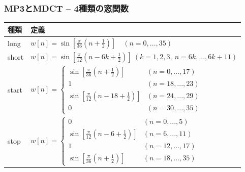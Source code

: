 \documentclass[14pt,xcolor=dvipsnames,table,dvipdfmx]{beamer}
\begin{document}
\begin{frame}[c]
    \frametitle{MP3とMDCT -- 4種類の窓関数}
    \footnotesize
    \begin{table}[H]
        \begin{tabular}{|l|l|}
            \toprule
            種類 & 定義 \\ 
            \midrule
             long & $\displaystyle w[n] = \sin\left[ \frac{\pi}{36} \left( n + \frac{1}{2} \right) \right] \quad (n = 0, ..., 35)$ \\[3ex]
            short & $\displaystyle w[n] = \sin\left[ \frac{\pi}{12} \left( n - 6k + \frac{1}{2} \right) \right] \ (k = 1,2,3,\ n = 6k, ..., 6k+11)$ \\[3ex]
            start & $\displaystyle w[n] =
            \left\{ \begin{array}{ll}
                \sin\left[ \frac{\pi}{36} \left( n + \frac{1}{2} \right) \right] & (n = 0, ..., 17) \\
                1 & (n = 18, ..., 23) \\
                \sin\left[ \frac{\pi}{12} \left( n - 18 + \frac{1}{2} \right) \right] & (n = 24, ..., 29) \\
                0 & (n = 30, ..., 35)
            \end{array}\right.$ \\[5ex]
            stop & $\displaystyle w[n] =
            \left\{ \begin{array}{ll}
                0 & (n = 0, ..., 5) \\
                \sin\left[ \frac{\pi}{12} \left( n - 6 + \frac{1}{2} \right) \right] & (n = 6, ..., 11) \\
                1 & (n = 12, ..., 17) \\
                \sin\left[ \frac{\pi}{36} \left( n + \frac{1}{2} \right) \right] & (n = 18, ..., 35)
            \end{array}\right.$ \\[5ex] \hline
        \end{tabular}
    \end{table}
\end{frame}
\end{document}
